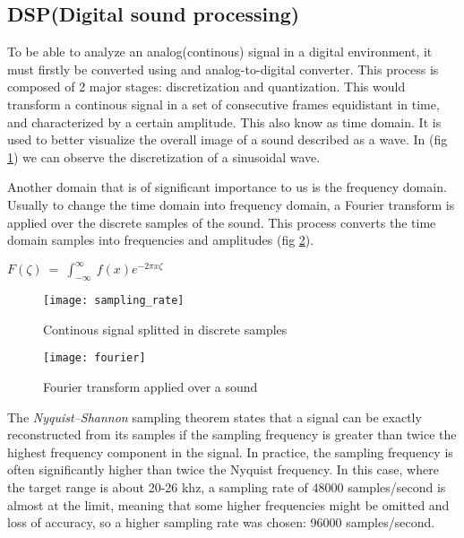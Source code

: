 \documentclass[12pt]{report}
\begin{document}
\subsection{DSP(Digital sound processing)}
To be able to analyze an analog(continous) signal in a digital environment, it must firstly be converted using and analog-to-digital converter. This process is composed of 2 major stages: discretization and quantization. This would transform a continous signal in a set of consecutive frames equidistant in time, and characterized by a certain amplitude. This also know as time domain. It is used to better visualize the overall image of a sound described as a wave. In (fig \ref{fig:samp_rate}) we can observe the discretization of a sinusoidal wave.

Another domain that is of significant importance to us is the frequency domain. Usually to change the time domain into frequency domain, a Fourier transform is applied over the discrete samples of the sound. This process converts the time domain samples into frequencies and amplitudes (fig \ref{fig:fourier}).

\begin{center}
\begin{math}
F\left(\zeta \right)\:=\:\int _{-\infty }^{\infty }\:f\left(x\right)e^{-2\pi x\zeta }
\end{math}
\end{center}


\begin{figure}
\centering
\texttt{[image: sampling\_rate]}
\caption{Continous signal splitted in discrete samples}
\label{fig:samp_rate}
\end{figure}

\begin{figure}
\centering
\texttt{[image: fourier]}
\caption{Fourier transform applied over a sound}
\label{fig:fourier}
\end{figure}


The \emph{Nyquist–Shannon} sampling theorem states that a signal can be exactly reconstructed from its samples if the sampling frequency is greater than twice the highest frequency component in the signal. In practice, the sampling frequency is often significantly higher than twice the Nyquist frequency\cite{note5}. In this case, where the target range is about 20-26 khz, a sampling  rate of 48000 samples/second is almost at the limit, meaning that some higher frequencies might be omitted and loss of accuracy, so a higher sampling rate was chosen: 96000 samples/second.
\end{document}

